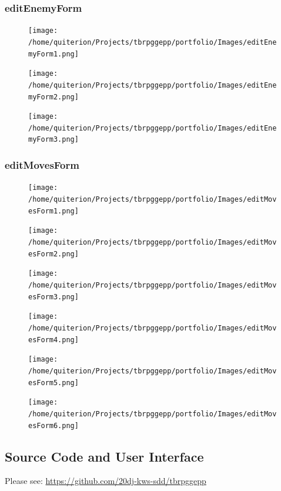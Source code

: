\documentclass{article} \usepackage[margin=1in,headheight=57pt,headsep=0.1in]{geometry}
\begin{document}
\subsubsection{editEnemyForm}
\begin{figure}[H]
	\centering
	\texttt{[image: /home/quiterion/Projects/tbrpggepp/portfolio/Images/editEnemyForm1.png]}
\end{figure}
\begin{figure}[H]
	\centering
	\texttt{[image: /home/quiterion/Projects/tbrpggepp/portfolio/Images/editEnemyForm2.png]}
\end{figure}
\begin{figure}[H]
	\centering
	\texttt{[image: /home/quiterion/Projects/tbrpggepp/portfolio/Images/editEnemyForm3.png]}
\end{figure}

\subsubsection{editMovesForm}
\begin{figure}[H]
	\centering
	\texttt{[image: /home/quiterion/Projects/tbrpggepp/portfolio/Images/editMovesForm1.png]}
\end{figure}
\begin{figure}[H]
	\centering
	\texttt{[image: /home/quiterion/Projects/tbrpggepp/portfolio/Images/editMovesForm2.png]}
\end{figure}
\begin{figure}[H]
	\centering
	\texttt{[image: /home/quiterion/Projects/tbrpggepp/portfolio/Images/editMovesForm3.png]}
\end{figure}
\begin{figure}[H]
	\centering
	\texttt{[image: /home/quiterion/Projects/tbrpggepp/portfolio/Images/editMovesForm4.png]}
\end{figure}
\begin{figure}[H]
	\centering
	\texttt{[image: /home/quiterion/Projects/tbrpggepp/portfolio/Images/editMovesForm5.png]}
\end{figure}
\begin{figure}[H]
	\centering
	\texttt{[image: /home/quiterion/Projects/tbrpggepp/portfolio/Images/editMovesForm6.png]}
\end{figure}

\newpage
\subsection{Source Code and User Interface}
Please see: \url{https://github.com/20dj-kws-sdd/tbrpggepp}
\end{document}
